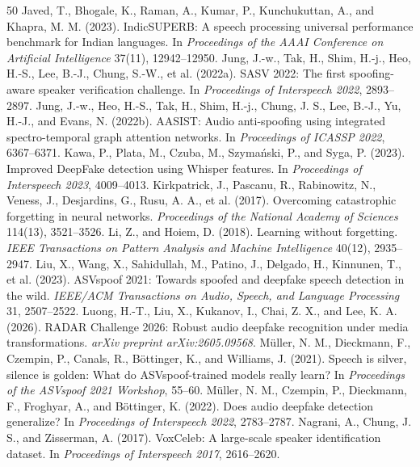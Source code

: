 \documentclass[10pt,a4paper,twocolumn]{article}
\begin{document}
\begin{thebibliography}{50}
 Javed, T., Bhogale, K., Raman, A., Kumar, P., Kunchukuttan, A., and Khapra, M. M. (2023). IndicSUPERB: A speech processing universal performance benchmark for Indian languages. In \emph{Proceedings of the AAAI Conference on Artificial Intelligence} 37(11), 12942--12950.
 Jung, J.-w., Tak, H., Shim, H.-j., Heo, H.-S., Lee, B.-J., Chung, S.-W., et al. (2022a). SASV 2022: The first spoofing-aware speaker verification challenge. In \emph{Proceedings of Interspeech 2022}, 2893--2897.
 Jung, J.-w., Heo, H.-S., Tak, H., Shim, H.-j., Chung, J. S., Lee, B.-J., Yu, H.-J., and Evans, N. (2022b). AASIST: Audio anti-spoofing using integrated spectro-temporal graph attention networks. In \emph{Proceedings of ICASSP 2022}, 6367--6371.
 Kawa, P., Plata, M., Czuba, M., Szyma\'nski, P., and Syga, P. (2023). Improved DeepFake detection using Whisper features. In \emph{Proceedings of Interspeech 2023}, 4009--4013.
 Kirkpatrick, J., Pascanu, R., Rabinowitz, N., Veness, J., Desjardins, G., Rusu, A. A., et al. (2017). Overcoming catastrophic forgetting in neural networks. \emph{Proceedings of the National Academy of Sciences} 114(13), 3521--3526.
 Li, Z., and Hoiem, D. (2018). Learning without forgetting. \emph{IEEE Transactions on Pattern Analysis and Machine Intelligence} 40(12), 2935--2947.
 Liu, X., Wang, X., Sahidullah, M., Patino, J., Delgado, H., Kinnunen, T., et al. (2023). ASVspoof 2021: Towards spoofed and deepfake speech detection in the wild. \emph{IEEE/ACM Transactions on Audio, Speech, and Language Processing} 31, 2507--2522.
 Luong, H.-T., Liu, X., Kukanov, I., Chai, Z. X., and Lee, K. A. (2026). RADAR Challenge 2026: Robust audio deepfake recognition under media transformations. \emph{arXiv preprint arXiv:2605.09568}.
 M\"uller, N. M., Dieckmann, F., Czempin, P., Canals, R., B\"ottinger, K., and Williams, J. (2021). Speech is silver, silence is golden: What do ASVspoof-trained models really learn? In \emph{Proceedings of the ASVspoof 2021 Workshop}, 55--60.
 M\"uller, N. M., Czempin, P., Dieckmann, F., Froghyar, A., and B\"ottinger, K. (2022). Does audio deepfake detection generalize? In \emph{Proceedings of Interspeech 2022}, 2783--2787.
 Nagrani, A., Chung, J. S., and Zisserman, A. (2017). VoxCeleb: A large-scale speaker identification dataset. In \emph{Proceedings of Interspeech 2017}, 2616--2620.

\end{thebibliography}
\end{document}
